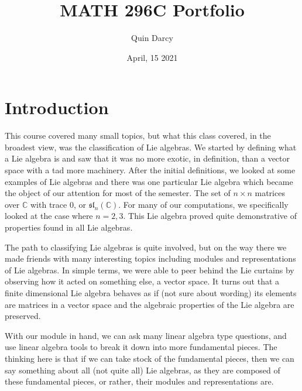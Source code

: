 \documentclass[12pt]{article}
\theoremstyle{definition}
\theoremstyle{definition}
\begin{document}
\title{MATH 296C Portfolio}
\author{Quin Darcy}
\date{April, 15 2021}
\maketitle
\newpage
\tableofcontents
\section{Introduction}
This course covered many small topics, but what this class covered, in the 
broadest view, was the classification of Lie algebras. We started by defining 
what a Lie algebra is and saw that it was no more exotic, in definition, than 
a vector space with a tad more machinery. After the initial definitions, we looked 
at some examples of Lie algebras and there was one particular Lie algebra which 
became the object of our attention for most of the semester. The set of $n\times n$ 
matrices over $\mathbb{C}$ with trace 0, or $\mathfrak{sl}_n(\mathbb{C})$. For many 
of our computations, we specifically looked at the case where $n=2,3$. This Lie 
algebra proved quite demonstrative of properties found in all Lie algebras.
\par The path to classifying Lie algebras is quite involved, but on the way there 
we made friends with many interesting topics including modules and representations of
Lie algebras. In simple terms, we were able to peer behind the Lie curtains by observing 
how it acted on something else, a vector space. It turns out that a finite dimensional 
Lie algebra behaves as if (not sure about wording) its elements are matrices in a vector 
space and the algebraic properties of the Lie algebra are preserved. \par With our module 
in hand, we can ask many linear algebra type questions, and use linear algebra tools to
break it down into more fundamental pieces. The thinking here is that if we can take 
stock of the fundamental pieces, then we can say something about all (not quite all) Lie
algebras, as they are composed of these fundamental pieces, or rather, their modules and 
representations are.
\end{document}

